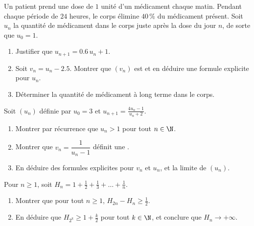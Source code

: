 \begin{exercise}[$\star\star$]\label{exo:g12:seq:7}
Un patient prend une dose de $1$ unité d'un médicament chaque matin.
Pendant chaque période de $24$ heures, le corps élimine $40\,\%$ du
médicament présent. Soit $u_n$ la quantité de médicament dans le corps
juste après la dose du jour $n$, de sorte que $u_0 = 1$.
\begin{enumerate}
  \item Justifier que $u_{n+1} = 0.6\,u_n + 1$.
  \item Soit $v_n = u_n - 2.5$. Montrer que $(v_n)$ est  et en
        déduire une formule explicite pour $u_n$.
  \item Déterminer la quantité de médicament à long terme dans le corps.
\end{enumerate}
\end{exercise}

\begin{exercise}[$\star\star$]\label{exo:g12:seq:8}
Soit $(u_n)$ définie par $u_0 = 3$ et $u_{n+1} = \frac{4u_n - 1}{u_n + 2}$.
\begin{enumerate}
  \item Montrer par récurrence que $u_n > 1$ pour tout $n \in \N$.
  \item Montrer que $v_n = \dfrac{1}{u_n - 1}$ définit une .
  \item En déduire des formules explicites pour $v_n$ et $u_n$, et la
        limite de $(u_n)$.
\end{enumerate}
\end{exercise}

\begin{exercise}[$\star\star\star$]\label{exo:g12:seq:9}
Pour $n \geq 1$, soit
$H_n = 1 + \frac{1}{2} + \frac{1}{3} + \dots + \frac{1}{n}$.
\begin{enumerate}
  \item Montrer que pour tout $n \geq 1$, $H_{2n} - H_n \geq \frac{1}{2}$.
  \item En déduire que $H_{2^k} \geq 1 + \frac{k}{2}$ pour tout
        $k \in \N$, et conclure que $H_n \to +\infty$.
\end{enumerate}
\end{exercise}

